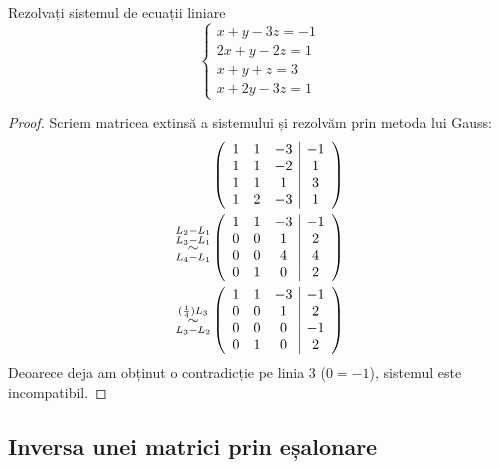 \begin{exercise}[214]
Rezolvați sistemul de ecuații liniare
\[
    \begin{cases}
    x + y - 3z = -1 \\
    2x + y - 2z = 1 \\
    x + y + z = 3 \\
    x + 2y - 3z = 1
    \end{cases}
\]
\end{exercise}
\begin{proof}
Scriem matricea extinsă a sistemului și rezolvăm prin metoda lui Gauss:
\begin{align*}
    &\left(\begin{array}{ccc|c}
    1 & 1 & -3 & -1 \\
    1 & 1 & -2 & 1 \\
    1 & 1 & 1 & 3 \\
    1 & 2 & -3 & 1
    \end{array}\right) \\
    \operatorname*{\sim}^{\substack{L_2 - L_1 \\ L_3 - L_1}}_{L_4 - L_1}
    &\left(\begin{array}{ccc|c}
    1 & 1 & -3 & -1 \\
    0 & 0 & 1 & 2 \\
    0 & 0 & 4 & 4 \\
    0 & 1 & 0 & 2
    \end{array}\right) \\
    \operatorname*{\sim}^{(\frac{1}{4}) L_3}_{L_3 - L_2}
    &\left(\begin{array}{ccc|c}
    1 & 1 & -3 & -1 \\
    0 & 0 & 1 & 2 \\
    0 & 0 & 0 & -1 \\
    0 & 1 & 0 & 2
    \end{array}\right)
\end{align*}
Deoarece deja am obținut o contradicție pe linia 3 (\(0 = -1\)), sistemul este incompatibil. 
\end{proof}

\subsection{Inversa unei matrici prin eșalonare}

